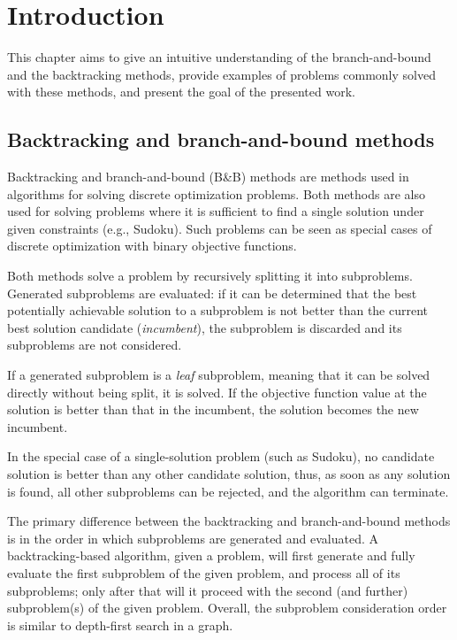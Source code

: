 \chapter{Introduction}
\label{chap:intro}

This chapter aims to give an intuitive understanding of the branch-and-bound and
the backtracking methods, provide examples of problems commonly solved with these methods,
and present the goal of the presented work.

\section{Backtracking and branch-and-bound methods}

Backtracking and branch-and-bound (B\&B) methods are methods used in
algorithms for solving discrete optimization problems. Both methods are also used for solving
problems where it is sufficient to find a single solution under given constraints
(e.g., Sudoku). Such problems can be seen as special cases of discrete optimization with
binary objective functions.

Both methods solve a problem by recursively splitting it into subproblems. Generated
subproblems are evaluated: if it can be determined that the best potentially achievable
solution to a subproblem is not better than the current best solution candidate
(\emph{incumbent}), the subproblem is discarded
and its subproblems are not considered.

If a generated subproblem is a \emph{leaf} subproblem, meaning that it can be solved directly
without being split, it is solved. If the objective function value at the solution is better
than that in the incumbent, the solution becomes the new incumbent.

In the special case of a single-solution problem (such as Sudoku), no candidate solution
is better than any other candidate solution, thus, as soon as any solution is found,
all other subproblems can be rejected, and the algorithm can terminate.

\sloppy
The primary difference between the backtracking and branch-and-bound methods
is in the order in which subproblems are generated and evaluated. A backtracking-based
algorithm, given a problem, will first generate and fully evaluate the first subproblem
of the given problem, and process all of its subproblems; only after that will it proceed with
the second (and further) subproblem(s) of the given problem. Overall, the subproblem
consideration order is similar to depth-first search in a graph.

